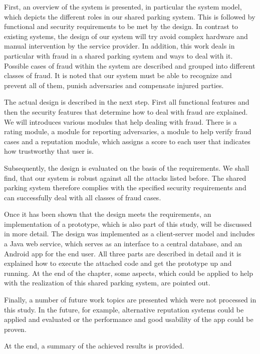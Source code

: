 First, an overview of the system is presented, in particular the system model, which depicts the different roles in our shared parking system. This is followed by functional and security requirements to be met by the design. In contrast to existing systems, the design of our system will try avoid complex hardware and manual intervention by the service provider. In addition, this work deals in particular with fraud in a shared parking system and ways to deal with it. Possible cases of fraud within the system are described and grouped into different classes of fraud. It is noted that our system must be able to recognize and prevent all of them, punish adversaries and compensate injured parties.

The actual design is described in the next step. First all functional features and then the security features that determine how to deal with fraud are explained. We will introduces various modules that help dealing with fraud. There is a rating module, a module for reporting adversaries, a module to help verify fraud cases and a reputation module, which assigns a score to each user that indicates how trustworthy that user is.

Subsequently, the design is evaluated on the basis of the requirements. We shall find, that our system is robust against all the attacks listed before. The shared parking system therefore complies with the specified security requirements and can successfully deal with all classes of fraud cases.

Once it has been shown that the design meets the requirements, an implementation of a prototype, which is also part of this study, will be discussed in more detail. The design was implemented as a client-server model and includes a Java web service, which serves as an interface to a central database, and an Android app for the end user. All three parts are described in detail and it is explained how to execute the attached code and get the prototype up and running. At the end of the chapter, some aspects, which could be applied to help with the realization of this shared parking system, are pointed out.

Finally, a number of future work topics are presented which were not processed in this study. In the future, for example, alternative reputation systems could be applied and evaluated or the performance and good usability of the app could be proven.

At the end, a summary of the achieved results is provided.
